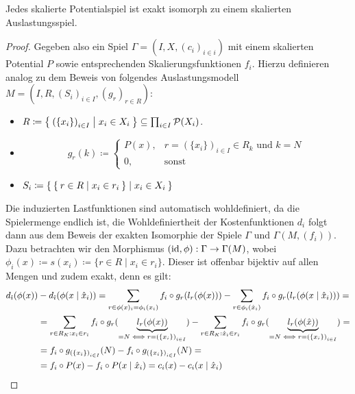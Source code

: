 \begin{satz}
	Jedes skalierte Potentialspiel ist exakt isomorph zu einem skalierten Auslastungsspiel.
\end{satz}

\begin{proof}
	Gegeben also ein Spiel $\Gamma = (I, X, (c_i)_{i\in i})$ mit einem skalierten Potential $P$ sowie entsprechenden Skalierungsfunktionen $f_i$. Hierzu definieren analog zu dem Beweis von  folgendes Auslastungsmodell $M = (I, R, (S_i)_{i \in I}, (g_r)_{r \in R})$:
	\begin{itemize}
		\item $R \coloneqq \Set{\left(\{x_i\}\right)_{i \in I} | x_i \in X_i } \subseteq \prod_{i \in I}\mathcal{P}(X_i)$.
		\item \[g_r(k) \coloneqq 
		\begin{cases}
		P(x), 					&r = \left(\{x_i\}\right)_{i \in I} \in R_k 													\text{ und } k=N \\
		0,						&\text{sonst}
		\end{cases}\]
		\item $S_i \coloneqq \Set{ \Set{r \in R | x_i \in r_i} | x_i \in X_i }$
	\end{itemize}
	Die induzierten Lastfunktionen sind automatisch wohldefiniert, da die Spielermenge endlich ist, die Wohldefiniertheit der Kostenfunktionen $d_i$ folgt dann aus dem Beweis der exakten Isomorphie der Spiele $\Gamma$ und $\Gamma(M, (f_i))$. Dazu betrachten wir den Morphismus $(\mathrm{id}, \phi): \Gamma \to \Gamma(M)$, wobei $\phi_i(x) \coloneqq s(x_i) \coloneqq \{r \in R \mid x_i \in r_i\}$. Dieser ist offenbar bijektiv auf allen Mengen und zudem exakt, denn es gilt:
	\begin{align*}
	d_{\hat{\imath}}(\phi(x)) &- d_{\hat{\imath}}(\phi(x \mid \hat{x}_i)) =\sum_{r \in \phi(x)_{\hat{\imath}} = \phi_{\hat{\imath}}(x_{\hat{\imath}})} f_i \circ g_r(l_r(\phi(x))) - \sum_{r \in \phi_{\hat{\imath}}(\hat{x}_{\hat{\imath}})} f_i \circ g_r(l_r(\phi(x \mid \hat{x}_i))) = \\
	&=\sum_{r \in R_K: x_{\hat{\imath}} \in r_{\hat{\imath}}} f_i \circ g_r(\underbrace{l_r(\phi(x))}_{= N \iff r = \left(\{x_i\}\right)_{i \in I}}) -
		\sum_{r \in R_K: \hat{x}_{\hat{\imath}} \in r_{\hat{\imath}}} f_i \circ g_r(\underbrace{l_r(\phi(\hat{x}))}_{= N \iff r = \left(\{x_i\}\right)_{i \in I}}) = \\
	&=f_i \circ g_{\left(\{x_i\}\right)_{i \in I}}(N) - f_i \circ g_{\left(\{x_i\}\right)_{i \in I}}(N) = \\
	&=f_i \circ P(x) - f_i \circ P(x \mid \hat{x}_i) = c_i(x) - c_i(x \mid \hat{x}_i)	\qedhere							
	\end{align*}
\end{proof}

